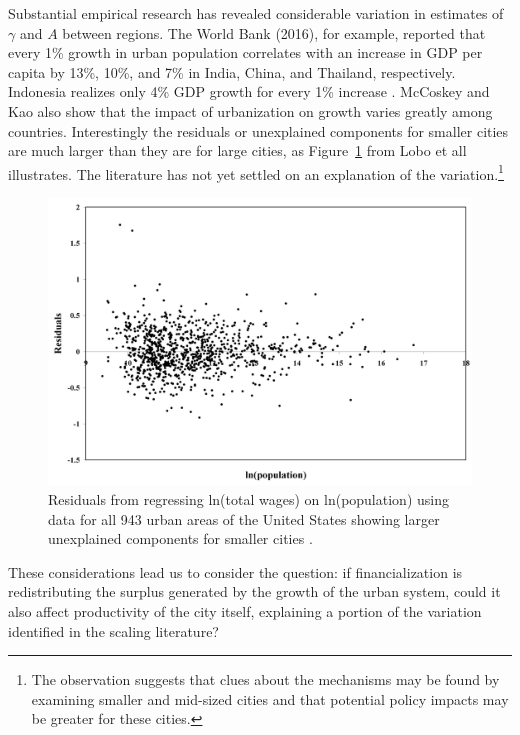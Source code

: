 
Substantial empirical research has revealed considerable variation in estimates of $\gamma$ and $A$ between regions. \cite{mccoskeyPanelDataInvestigation1999, haryantoRelationshipUrbanizationEducation2021, pugaMagnitudeCausesAgglomeration2010, loboUrbanScalingProduction2013} The World Bank (2016), for example, reported that every 1\% growth in urban population correlates with an increase in GDP per capita by 13\%, 10\%, and 7\% in India, China, and Thailand, respectively. Indonesia realizes only 4\% GDP growth for every 1\% increase \cite{haryantoRelationshipUrbanizationEducation2021}. McCoskey and Kao \cite{mccoskeyPanelDataInvestigation1999} also show that the impact of urbanization on growth varies greatly among countries. 
Interestingly the residuals or unexplained components for smaller cities are much larger than they are for large cities, as Figure~\ref{fig-residuals-lobo} from Lobo et all \cite{loboUrbanScalingProduction2013} illustrates.  The literature \cite{loboUrbanScalingProduction2013, pugaMagnitudeCausesAgglomeration2010} has not yet settled on an explanation of the variation.\footnote{The observation suggests that clues about the mechanisms may be found by examining smaller and mid-sized cities and that potential policy impacts may be greater for these cities.} 
\begin{figure}[h!tb]
\centering
\includegraphics[scale=0.40]{fig/residuals-lobo.png}
\caption[Residuals from regressing ln(total wages) on ln(population)]{Residuals from regressing ln(total wages) on ln(population) using data for all 943 urban areas of the United States showing larger unexplained components for smaller cities  \cite{loboUrbanScalingProduction2013}.}\label{fig-residuals-lobo}
\end{figure} 
These considerations lead us to consider the question: if financialization is redistributing the surplus generated by the growth of the urban system, could it also affect  productivity of the city itself, explaining a portion of the variation identified in the scaling literature? 



